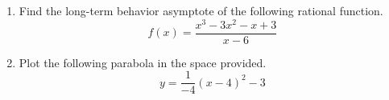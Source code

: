 \documentclass{article}
\begin{document}
\begin{enumerate}
\begin{center}
\CartesianPlane[axes=yes,h=10,w=10]
\end{center} \vspace{1cm}

\newpage

\item Find the long-term behavior asymptote of the following rational function. \[ f(x) = \frac{x^3 - 3x^2 - x + 3}{x - 6} \] \vspace{6cm}

\item Plot the following parabola in the space provided. \[ y = \frac{1}{-4} \left(x - 4\right)^2 -3 \]

\begin{center}
\CartesianPlane[axes=yes,h=10,w=10]
\end{center} \vspace{1cm}
\end{enumerate}
\end{document}
